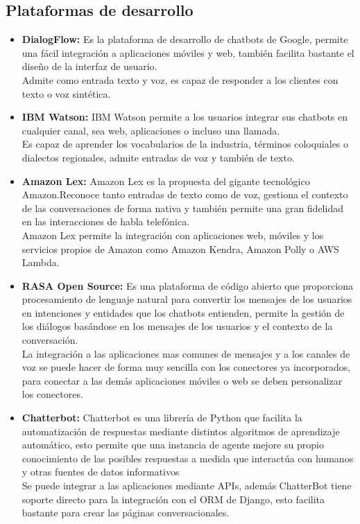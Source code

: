\subsection{Plataformas de desarrollo}
\begin{itemize}
    \item \textbf{DialogFlow:}
        Es la plataforma de desarrollo de chatbots de Google, permite una fácil integración a aplicaciones móviles y web, también facilita bastante el diseño de la interfaz de usuario.\\
        Admite como entrada texto y voz, es capaz de responder a los clientes con texto o voz sintética.\\\cite{Dialogflow}
    \item \textbf{IBM Watson:}
        IBM Watson  permite a los usuarios integrar sus chatbots en cualquier canal, sea web, aplicaciones o incluso una llamada.\\
        Es capaz de aprender los vocabularios de la industria,  términos coloquiales o dialectos regionales, admite entradas de voz y también de texto. \\\cite{IBMCloud2020}
    \item \textbf{Amazon Lex:}
        Amazon Lex es la propuesta del gigante tecnológico Amazon.Reconoce tanto entradas de texto como de voz, gestiona el contexto de las conversaciones de forma nativa y también permite una gran fidelidad en las interacciones de habla telefónica.\\
        Amazon Lex permite la integración con aplicaciones web, móviles y los servicios propios de Amazon como Amazon Kendra, Amazon Polly o AWS Lambda.\\\cite{Amazon_Lex}
    \item \textbf{RASA Open Source:}
    Es una plataforma de código abierto que proporciona procesamiento de lenguaje natural para convertir los mensajes de los usuarios en intenciones y entidades que los chatbots entienden, permite la gestión de los diálogos basándose en los mensajes de los usuarios y el contexto de la conversación.\\
    La integración a las aplicaciones mas comunes de mensajes y a los canales de voz se puede hacer de forma muy sencilla con los conectores ya incorporados, para conectar a las demás aplicaciones móviles o web se deben personalizar los conectores.\\\cite{Rasa}
    \item \textbf{Chatterbot:}
    Chatterbot es una librería de Python que facilita la automatización de respuestas mediante  distintos algoritmos de aprendizaje automático, esto permite que una instancia de agente mejore su propio conocimiento de las posibles respuestas a medida que interactúa con humanos y otras fuentes de datos informativos\\
    Se puede integrar a las aplicaciones mediante APIs, además ChatterBot tiene soporte directo para la integración con el ORM de Django, esto facilita bastante para crear las páginas conversacionales.\cite{Chatterbot}\\
\end{itemize}

